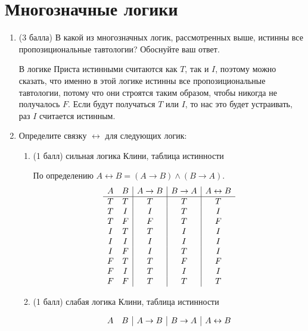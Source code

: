 \section{Многозначные логики}
\begin{enumerate}
  \item (3 балла) В какой из многозначных логик, рассмотренных выше, истинны все пропозициональные тавтологии? Обоснуйте ваш ответ.
  \begin{solution}
    В логике Приста истинными считаются как $T$, так и $I$, поэтому можно сказать, что именно в этой логике истинны все пропозициональные тавтологии, потому что они строятся таким образом, чтобы никогда не получалось $F$. Если будут получаться $T$ или $I$, то нас это будет устраивать, раз $I$ считается истинным.
  \end{solution}
  \item Определите связку $\leftrightarrow$ для следующих логик:
  \begin{enumerate}
    \item (1 балл) сильная логика Клини, таблица истинности
    \begin{solution}
      По определению $A \leftrightarrow B = (A \rightarrow B) \land (B \rightarrow A)$.
      \begin{displaymath}
      \begin{array}{c c|c|c|c}
        A & B & A \rightarrow B & B \rightarrow A & A \leftrightarrow B\\
        \hline
        T & T & T & T & T\\
        T & I & I & T & I\\
        T & F & F & T & F\\
        I & T & T & I & I\\
        I & I & I & I & I\\
        I & F & I & T & I\\
        F & T & T & F & F\\
        F & I & T & I & I\\
        F & F & T & T & T
      \end{array}
      \end{displaymath}
    \end{solution}
    \item (1 балл) слабая логика Клини, таблица истинности
    \begin{solution}
      \begin{displaymath}
      \begin{array}{c c|c|c|c}
        A & B & A \rightarrow B & B \rightarrow A & A \leftrightarrow B\\

\end{array}
\end{displaymath}
\end{solution}
\end{enumerate}
\end{enumerate}
